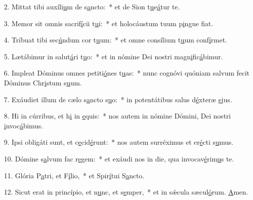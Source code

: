 2. Mittat tibi auxíli\uline{u}m de s\uline{a}ncto:~* et de Sion t\uline{u}e\uline{á}tur te.\par 
3. Memor sit omnis sacrif\uline{í}cii t\uline{u}i:~* et holocáustum tuum p\uline{i}ngue f\uline{i}at.\par 
4. Tríbuat tibi sec\uline{ú}ndum cor t\uline{u}um:~* et omne consílium t\uline{u}um conf\uline{í}rmet.\par 
5. Lætábimur in salut\uline{á}ri t\uline{u}o:~* et in nómine Dei nostri magn\uline{i}fic\uline{á}bimur.\par 
6. Impleat Dóminus omnes petiti\uline{ó}nes t\uline{u}as:~* nunc cognóvi quóniam salvum fecit Dóminus Chr\uline{i}stum s\uline{u}um.\par 
7. Exáudiet illum de cælo s\uline{a}ncto s\uline{u}o:~* in potentátibus salus d\uline{é}xteræ \uline{e}jus.\par 
8. Hi in cúrribus, et h\uline{i} in \uline{e}quis:~* nos autem in nómine Dómini, Dei nostri \uline{i}nvoc\uline{á}bimus.\par 
9. Ipsi obligáti sunt, et c\uline{e}cid\uline{é}runt:~* nos autem surréximus et er\uline{é}cti s\uline{u}mus.\par 
10. Dómine s\uline{a}lvum fac r\uline{e}gem:~* et exáudi nos in die, qua invocav\uline{é}rim\uline{u}s te.\par 
11. Glória P\uline{a}tri, et F\uline{í}lio,~* et Spir\uline{í}tui S\uline{a}ncto.\par 
12. Sicut erat in princípio, et n\uline{u}nc, et s\uline{e}mper,~* et in sǽcula sæcul\uline{ó}rum. \uline{A}men.\par 
